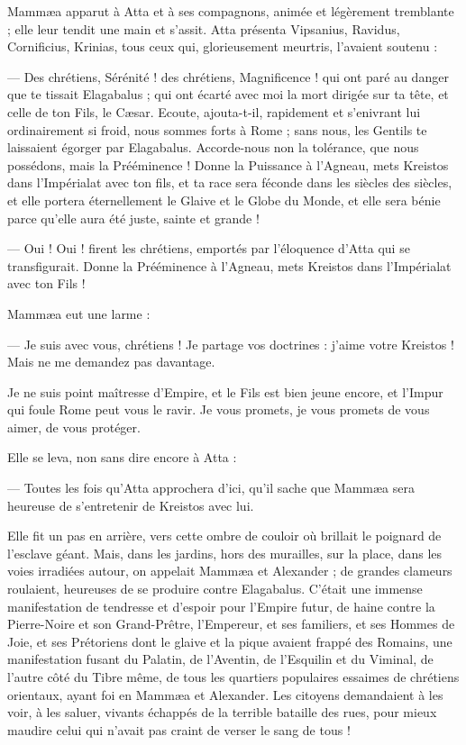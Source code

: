 \documentclass[a4paper, 11pt, oneside, polutonikogreek, french]{article}
\begin{document}
Mammæa apparut à Atta et à ses compagnons, animée et légèrement tremblante ; elle leur tendit une main et s'assit. Atta présenta Vipsanius, Ravidus, Cornificius, Krinias, tous ceux qui, glorieusement meurtris, l'avaient soutenu :

--- Des chrétiens, Sérénité ! des chrétiens, Magnificence ! qui ont paré au danger que te tissait Elagabalus ; qui ont écarté avec moi la mort dirigée sur ta tête, et celle de ton Fils, le Cæsar. Ecoute, ajouta-t-il, rapidement et s'enivrant lui ordinairement si froid, nous sommes forts à Rome ; sans nous, les Gentils te laissaient égorger par Elagabalus. Accorde-nous non la tolérance, que nous possédons, mais la Prééminence ! Donne la Puissance à l'Agneau, mets Kreistos dans l'Impérialat avec ton fils, et ta race sera féconde dans les siècles des siècles, et elle portera éternellement le Glaive et le Globe du Monde, et elle sera bénie parce qu'elle aura été juste, sainte et grande !

--- Oui ! Oui ! firent les chrétiens, emportés par l’éloquence d'Atta qui se transfigurait. Donne la Prééminence à l'Agneau, mets Kreistos dans l'Impérialat avec ton Fils !

Mammæa eut une larme :

--- Je suis avec vous, chrétiens ! Je partage vos doctrines : j'aime votre Kreistos ! Mais ne me demandez pas davantage.

Je ne suis point maîtresse d'Empire, et le Fils est bien jeune encore, et l'Impur qui foule Rome peut vous le ravir. Je vous promets, je vous promets de vous aimer, de vous protéger.

Elle se leva, non sans dire encore à Atta :

--- Toutes les fois qu'Atta approchera d'ici, qu'il sache que Mammæa sera heureuse de s'entretenir de Kreistos avec lui.

Elle fit un pas en arrière, vers cette ombre de couloir où brillait le poignard de l'esclave géant. Mais, dans les jardins, hors des murailles, sur la place, dans les voies irradiées autour, on appelait Mammæa et Alexander ; de grandes clameurs roulaient, heureuses de se produire contre Elagabalus. C'était une immense manifestation de tendresse et d'espoir pour l'Empire futur, de haine contre la Pierre-Noire et son Grand-Prêtre, l'Empereur, et ses familiers, et ses Hommes de Joie, et ses Prétoriens dont le glaive et la pique avaient frappé des Romains, une manifestation fusant du Palatin, de l’Aventin, de l'Esquilin et du Viminal, de l'autre côté du Tibre même, de tous les quartiers populaires essaimes de chrétiens orientaux, ayant foi en Mammæa et Alexander. Les citoyens demandaient à les voir, à les saluer, vivants échappés de la terrible bataille des rues, pour mieux maudire celui qui n'avait pas craint de verser le sang de tous !
\end{document}
